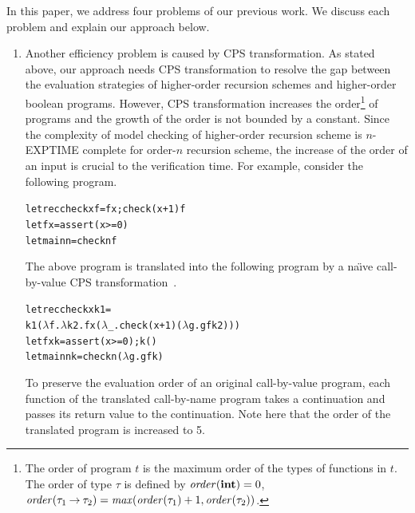 In this paper, we address four problems of our previous work.
We discuss each problem and explain our approach below.

\begin{enumerate}
\item Another efficiency problem is caused by CPS transformation.  As
      stated above, our approach needs CPS transformation to resolve the
      gap between the evaluation strategies of higher-order recursion
      schemes and higher-order boolean programs.  However, CPS
      transformation increases the order\footnote{The order of program
      $t$ is the maximum order of the types of functions in $t$.  The
      order of type $\tau$ is defined by $\mathit{order}(\mathbf{int})=0$,
      $\mathit{order}({\tau_1}\mathbin{\rightarrow}{\tau_2}) =
      \mathit{max}(\mathit{order}(\tau_1)+1, \mathit{order}(\tau_2))$.}
      of programs and the growth of the order is not bounded by a
      constant.  Since the complexity of model checking of higher-order
      recursion scheme is $n$-EXPTIME complete for order-$n$ recursion
      scheme, the increase of the order of an input is crucial to the
      verification time.
%
      For example, consider the following program.
\begin{alltt}
let rec check x f = f x; check (x+1) f
let f x = assert (x >= 0)
let main n = check n f
\end{alltt}
      The above program is translated into the following program by
      a na\"{\i}ve call-by-value CPS transformation~\cite{Plotkin1975}.
\begin{alltt}
let rec check x k1 =
  k1 (\(\lambda\)f.\(\lambda\)k2.f x (\(\lambda\)_.check (x+1) (\(\lambda\)g.g f k2)))
let f x k = assert (x >= 0); k ()
let main n k = check n (\(\lambda\)g. g f k)
\end{alltt}
      To preserve the evaluation order of an original call-by-value program,
      each function of the translated call-by-name program takes
      a continuation and passes its return value to the continuation.  Note here that the
      order of the translated program is increased to 5.

\end{enumerate}
